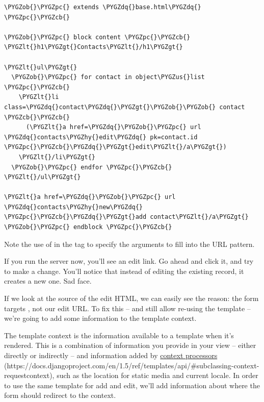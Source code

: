 \documentclass[letterpaper,10pt,english]{sphinxmanual}
\def\PYGZus{\char`\_}
\def\PYGZob{\char`\{}
\def\PYGZcb{\char`\}}
\def\PYGZlt{\char`\<}
\def\PYGZgt{\char`\>}
\def\PYGZpc{\char`\%}
\def\PYGZhy{\char`\-}
\def\PYGZdq{\char`\"}
\begin{document}
\begin{Verbatim}[commandchars=\\\{\}]
\PYGZob{}\PYGZpc{} extends \PYGZdq{}base.html\PYGZdq{} \PYGZpc{}\PYGZcb{}

\PYGZob{}\PYGZpc{} block content \PYGZpc{}\PYGZcb{}
\PYGZlt{}h1\PYGZgt{}Contacts\PYGZlt{}/h1\PYGZgt{}

\PYGZlt{}ul\PYGZgt{}
  \PYGZob{}\PYGZpc{} for contact in object\PYGZus{}list \PYGZpc{}\PYGZcb{}
    \PYGZlt{}li class=\PYGZdq{}contact\PYGZdq{}\PYGZgt{}\PYGZob{}\PYGZob{} contact \PYGZcb{}\PYGZcb{}
      (\PYGZlt{}a href=\PYGZdq{}\PYGZob{}\PYGZpc{} url \PYGZdq{}contacts\PYGZhy{}edit\PYGZdq{} pk=contact.id \PYGZpc{}\PYGZcb{}\PYGZdq{}\PYGZgt{}edit\PYGZlt{}/a\PYGZgt{})
    \PYGZlt{}/li\PYGZgt{}
  \PYGZob{}\PYGZpc{} endfor \PYGZpc{}\PYGZcb{}
\PYGZlt{}/ul\PYGZgt{}

\PYGZlt{}a href=\PYGZdq{}\PYGZob{}\PYGZpc{} url \PYGZdq{}contacts\PYGZhy{}new\PYGZdq{} \PYGZpc{}\PYGZcb{}\PYGZdq{}\PYGZgt{}add contact\PYGZlt{}/a\PYGZgt{}
\PYGZob{}\PYGZpc{} endblock \PYGZpc{}\PYGZcb{}
\end{Verbatim}

Note the use of  in the  tag to specify
the arguments to fill into the URL pattern.

If you run the server now, you'll see an edit link. Go ahead and click
it, and try to make a change. You'll notice that instead of editing
the existing record, it creates a new one. Sad face.

If we look at the source of the edit HTML, we can easily see the
reason: the form targets , not our edit URL. To fix this --
and still allow re-using the template -- we're going to add some
information to the template context.

The template context is the information available to a template when
it's rendered. This is a combination of information you provide in
your view -- either directly or indirectly -- and information added by
\href{https://docs.djangoproject.com/en/1.5/ref/templates/api/\#subclassing-context-requestcontext}{context processors} (https://docs.djangoproject.com/en/1.5/ref/templates/api/\#subclassing-context-requestcontext), such as the location for static media and
current locale. In order to use the same template for add and edit,
we'll add information about where the form should redirect to the
context.
\end{document}
